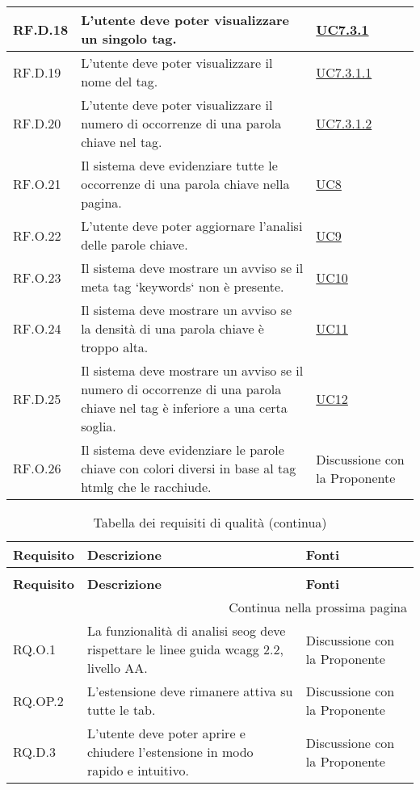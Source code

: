 \begin{longtable}{p{}p{}p{}}
\hline
RF.D.18 & L'utente deve poter visualizzare un singolo tag. & \hyperref[UC7point3point1]{UC7.3.1} \\
\hline
RF.D.19 & L'utente deve poter visualizzare il nome del tag. & \hyperref[UC7point3point1point1]{UC7.3.1.1} \\
\hline
RF.D.20 & L'utente deve poter visualizzare il numero di occorrenze di una parola chiave nel tag. & \hyperref[UC7point3point1point2]{UC7.3.1.2} \\
\hline
RF.O.21 & Il sistema deve evidenziare tutte le occorrenze di una parola chiave nella pagina. & \hyperref[UC8]{UC8} \\
\hline
RF.O.22 & L'utente deve poter aggiornare l'analisi delle parole chiave. & \hyperref[UC9]{UC9} \\
\hline
RF.O.23 & Il sistema deve mostrare un avviso se il meta tag `keywords` non è presente. & \hyperref[UC10]{UC10} \\
\hline
RF.O.24 & Il sistema deve mostrare un avviso se la densità di una parola chiave è troppo alta. & \hyperref[UC11]{UC11} \\
\hline
RF.D.25 & Il sistema deve mostrare un avviso se il numero di occorrenze di una parola chiave nel tag è inferiore a una certa soglia. & \hyperref[UC12]{UC12} \\
\hline
RF.O.26 & Il sistema deve evidenziare le parole chiave con colori diversi in base al tag \gls{htmlg} che le racchiude. & Discussione con la Proponente \\
\end{longtable}

\newpage

\renewcommand{\arraystretch}{1.5}
\begin{longtable}{p{}p{}p{}}
\caption{Tabella dei requisti di qualità}
\label{tab:requisiti-qualitativi} \\
\hline\hline
\textbf{Requisito} & \textbf{Descrizione} & \textbf{Fonti}\\
\endfirsthead
    
\caption[]{Tabella dei requisiti di qualità (continua)} \\
\hline\hline
\textbf{Requisito} & \textbf{Descrizione} & \textbf{Fonti} \\ 
\endhead
    
\multicolumn{3}{r}{{Continua nella prossima pagina}} \\ 
\endfoot
    
\hline
\endlastfoot

\hline
RQ.O.1 & La funzionalità di analisi \gls{seog} deve rispettare le linee guida \gls{wcagg} 2.2, livello AA. & Discussione con la Proponente \\
\hline
RQ.OP.2 & L'estensione deve rimanere attiva su tutte le tab. & Discussione con la Proponente \\
\hline
RQ.D.3 & L'utente deve poter aprire e chiudere l'estensione in modo rapido e intuitivo. & Discussione con la Proponente \\
\end{longtable}

